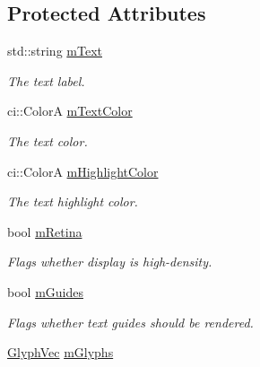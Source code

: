 \subsection*{Protected Attributes}
\begin{DoxyCompactItemize}
\item 
\hypertarget{class_gui_text_a95494b51514f038ea1368ad385798c9b}{std\-::string \hyperlink{class_gui_text_a95494b51514f038ea1368ad385798c9b}{m\-Text}}\label{class_gui_text_a95494b51514f038ea1368ad385798c9b}

\begin{DoxyCompactList}\small\item\em The text label. \end{DoxyCompactList}\item 
\hypertarget{class_gui_text_aae0d080e6c974b0c72f56494e2932ab1}{ci\-::\-Color\-A \hyperlink{class_gui_text_aae0d080e6c974b0c72f56494e2932ab1}{m\-Text\-Color}}\label{class_gui_text_aae0d080e6c974b0c72f56494e2932ab1}

\begin{DoxyCompactList}\small\item\em The text color. \end{DoxyCompactList}\item 
\hypertarget{class_gui_text_a7ff0747e05176d28ed733706713f98ba}{ci\-::\-Color\-A \hyperlink{class_gui_text_a7ff0747e05176d28ed733706713f98ba}{m\-Highlight\-Color}}\label{class_gui_text_a7ff0747e05176d28ed733706713f98ba}

\begin{DoxyCompactList}\small\item\em The text highlight color. \end{DoxyCompactList}\item 
\hypertarget{class_gui_text_ae0e22d961bb923537ffc924e97b38915}{bool \hyperlink{class_gui_text_ae0e22d961bb923537ffc924e97b38915}{m\-Retina}}\label{class_gui_text_ae0e22d961bb923537ffc924e97b38915}

\begin{DoxyCompactList}\small\item\em Flags whether display is high-\/density. \end{DoxyCompactList}\item 
\hypertarget{class_gui_text_a468dfb3b1c78d9590d58009688a8214f}{bool \hyperlink{class_gui_text_a468dfb3b1c78d9590d58009688a8214f}{m\-Guides}}\label{class_gui_text_a468dfb3b1c78d9590d58009688a8214f}

\begin{DoxyCompactList}\small\item\em Flags whether text guides should be rendered. \end{DoxyCompactList}\item 
\hypertarget{class_gui_text_a508a0c19105346ba9a64b5117a4518a5}{\hyperlink{class_gui_text_add2a12dfdb7539d11f2df1961e0d48d8}{Glyph\-Vec} \hyperlink{class_gui_text_a508a0c19105346ba9a64b5117a4518a5}{m\-Glyphs}}\label{class_gui_text_a508a0c19105346ba9a64b5117a4518a5}


\end{DoxyCompactItemize}
